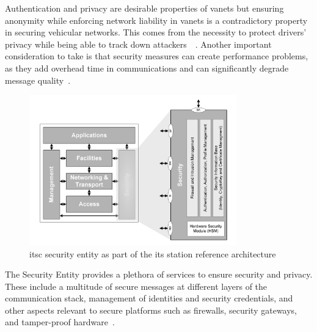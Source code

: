 Authentication and privacy are desirable properties of \glspl{vanet} but ensuring anonymity while enforcing network liability in \glspl{vanet} is a contradictory property in securing vehicular networks. This comes from the necessity to protect drivers' privacy while being able to track down attackers~\cite{jiang_ieee_2008}~\cite{malhi_security_2020}. 
Another important consideration to take is that security measures can create performance problems, as they add overhead time in communications and can significantly degrade message quality~\cite{toor_vehicle_2008}. 


\begin{figure}[htbp]
    \centering
    \includegraphics[width=0.8\textwidth]{Chapters/Figures/VANETs/security_entity.png}
   	\caption{\gls{itsc} security entity as part of the \gls{its} station reference architecture~\cite{etsi_intelligent_2010}}
   	\label{fig:security_entity}
\end{figure}


The Security Entity provides a plethora of services to ensure security and privacy. These include a multitude of secure messages at different layers of the communication stack, management of identities and security credentials, and other aspects relevant to secure platforms such as firewalls, security gateways, and tamper-proof hardware~\cite{etsi_intelligent_2014}.


